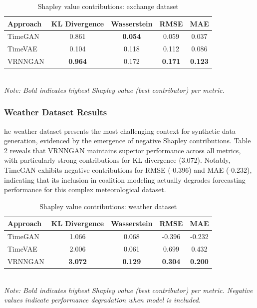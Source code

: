 \documentclass{article}
\begin{document}
\begin{table}[H]
\centering
\caption{Shapley value contributions: exchange dataset}
\label{tab:shapley_exchange}
\begin{tabular}{lcccc}
\toprule
\textbf{Approach} & \textbf{KL Divergence} & \textbf{Wasserstein} & \textbf{RMSE} & \textbf{MAE} \\
\midrule
TimeGAN & 0.861 & \textbf{0.054} & 0.059 & 0.037 \\
TimeVAE & 0.104 & 0.118 & 0.112 & 0.086 \\
VRNNGAN & \textbf{0.964} & 0.172 & \textbf{0.171} & \textbf{0.123} \\
\bottomrule
\end{tabular}
\\[0.5em]
\footnotesize
\textit{Note: Bold indicates highest Shapley value (best contributor) per metric.}
\end{table}

\subsubsection{Weather Dataset Results}
he weather dataset presents the most challenging context for synthetic data generation, evidenced by the emergence of negative Shapley contributions. Table \ref{tab:shapley_weather} reveals that VRNNGAN maintains superior performance across all metrics, with particularly strong contributions for KL divergence (3.072). Notably, TimeGAN exhibits negative contributions for RMSE (-0.396) and MAE (-0.232), indicating that its inclusion in coalition modeling actually degrades forecasting performance for this complex meteorological dataset.

\begin{table}[H]
\centering
\caption{Shapley value contributions: weather dataset}
\label{tab:shapley_weather}
\begin{tabular}{lcccc}
\toprule
\textbf{Approach} & \textbf{KL Divergence} & \textbf{Wasserstein} & \textbf{RMSE} & \textbf{MAE} \\
\midrule
TimeGAN & 1.066 & 0.068 & -0.396 & -0.232 \\
TimeVAE & 2.006 & 0.061 & 0.699 & 0.432 \\
VRNNGAN & \textbf{3.072} & \textbf{0.129} & \textbf{0.304} & \textbf{0.200} \\
\bottomrule
\end{tabular}
\\[0.5em]
\footnotesize
\textit{Note: Bold indicates highest Shapley value (best contributor) per metric. Negative values indicate performance degradation when model is included.}
\end{table}
\end{document}
